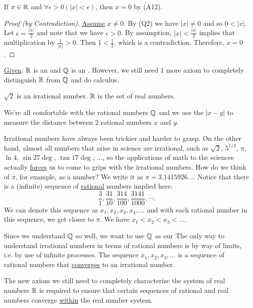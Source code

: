 \documentclass[]{article}
\begin{document}
\begin{theorem}
	If $x\in\mathbb{R}$ and $\forall\epsilon>0(|x|<\epsilon)$, then $x=0$ by (A12).
\end{theorem}
\begin{proof}
	[Proof (by Contradiction)] \ul{Assume} $x\neq 0$. By (Q2) we have $|x|\neq 0$ and so $0<|x|$. Let $\epsilon=\frac{|x|}{2}$ and note that we have $\epsilon>0$. By assumption, $|x|<\frac{|x|}{2}$ implies that multiplication by $\frac{1}{|x|}>0$. Then $1<\frac{1}{2}$, which is a contradiction. Therefore, $x=0$.
\end{proof}

\ul{Given}: $\mathbb{R}$ is an  and $\mathbb{Q}$ is an . However, we still need 1 more axiom to completely distinguish $\mathbb{R}$ from $\mathbb{Q}$ and do calculus.

\begin{example}
	$\sqrt{2}$ is an irrational number. $\mathbb{R}$ is the set of real numbers.
\end{example}

We're all comfortable with the rational numbers $\mathbb{Q}$ and we use the  $|x-y|$ to measure the distance between 2 rational numbers $x$ and $y$.

Irrational numbers have always been trickier and harder to grasp. On the other hand, almost all numbers that arise in science are irrational, such as $\sqrt{2}$, $5^{1/3}$, $\pi$, $\ln{4}$, $\sin{27\deg}$, $\tan{17\deg}$, $\dots$, so the applications of math to the sciences actually \ul{forces} us to come to grips with the irrational numbers.
How do we think of $\pi$, for example, as a number? We write it as $\pi = 3.1415926\dots$. Notice that there is a (infinite) sequence of \ul{rational} numbers implied here: $$\frac{3}{1},\frac{31}{10},\frac{314}{100},\frac{3141}{1000},\cdots.$$
We can denote this sequence as $x_1,x_2,x_3,x_4,\dots$ and with each rational number in this sequence, we get  closer to $\pi$.
We have $x_1<x_2<x_3<\dots$.

Since we understand $\mathbb{Q}$ so well, we want to use $\mathbb{Q}$ as our 
The only way to understand irrational numbers in terms of rational numbers is by way of limits, i.e. by use of infinite processes.
The sequence $x_1,x_2,x_3,\dots$ is a sequence of rational numbers that \ul{converges} to an irrational number.

The new axiom we still need to completely characterize the system of real numbers $\mathbb{R}$ is required to ensure that certain sequences of rational and real numbers converge \ul{within} the real number system.
\end{document}
